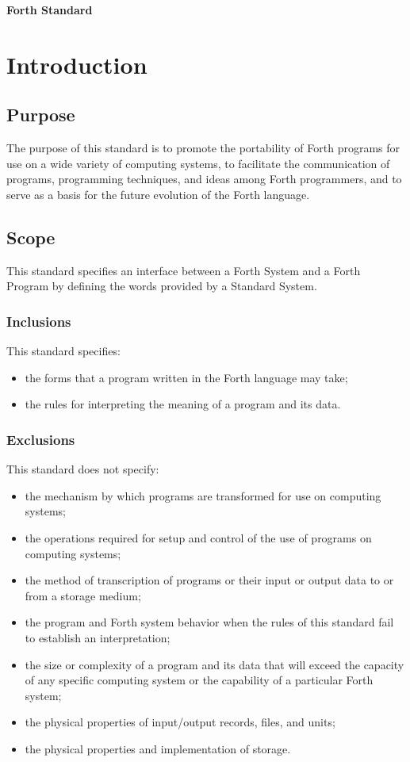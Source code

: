 
{\Large\bfseries Forth \snapshot{} Standard}

\chapter{Introduction}
\label{chap:intro}

\section{Purpose}
The purpose of this standard is to promote the portability of Forth
programs for use on a wide variety of computing systems, to facilitate
the communication of programs, programming techniques, and ideas among
Forth programmers, and to serve as a basis for the future evolution of
the Forth language.

\section{Scope}
This standard specifies an interface between a Forth System and a
Forth Program by defining the words provided by a Standard System.

\subsection{Inclusions}
This standard specifies:
\begin{itemize}
\item the forms that a program written in the Forth language may take;
\item the rules for interpreting the meaning of a program and its data.
\end{itemize}

\subsection{Exclusions} %
\label{intro:exclusions}

This standard does not specify:
\begin{itemize}
\item the mechanism by which programs are transformed for use on
	computing systems;
\item the operations required for setup and control of the use of
	programs on computing systems;
\item the method of transcription of programs or their input or
	output data to or from a storage medium;
\item the program and Forth system behavior when the rules of this
	standard fail to establish an interpretation;
\item the size or complexity of a program and its data that will
	exceed the capacity of any specific computing system or the
	capability of a particular Forth system;
\item the physical properties of input/output records, files, and units;
\item the physical properties and implementation of storage.
\end{itemize}

